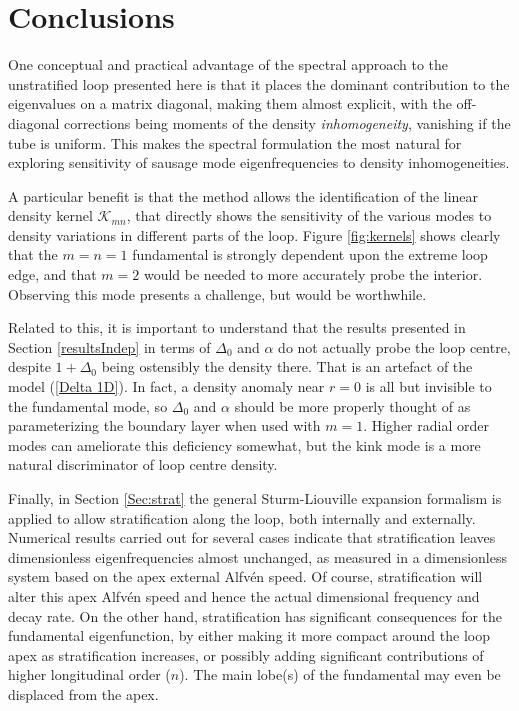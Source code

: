 \documentclass[12pt]{iopart}
\begin{document}
\section{Conclusions}

One conceptual and practical advantage of the spectral approach {to the unstratified loop} presented here is that it places the dominant contribution to the eigenvalues on a matrix diagonal, making them almost explicit, with the off-diagonal corrections being moments of the density \emph{inhomogeneity}, vanishing if the tube is uniform. This makes the spectral formulation the most natural for exploring sensitivity of sausage mode eigenfrequencies to density inhomogeneities.

A particular benefit is that the method allows the identification of the linear density kernel $\mathcal{K}_{mn}$, that directly shows the sensitivity of the various modes to density variations in different parts of the loop. Figure \ref{fig:kernels} shows clearly that the $m=n=1$ fundamental is strongly dependent upon the extreme loop edge, and that $m=2$ would be needed to more accurately probe the interior. Observing this mode presents a challenge, but would be worthwhile.

Related to this, it is important to understand that the results presented in Section \ref{resultsIndep} in terms of $\Delta_0$ and $\alpha$ do not actually probe the loop centre, despite $1+\Delta_0$ being ostensibly the density there. That is an artefact of the model (\ref{Delta 1D}). In fact, a density anomaly near $r=0$ is all but invisible to the fundamental mode, so $\Delta_0$ and $\alpha$ should be more properly thought of as parameterizing the boundary layer when used with $m=1$. Higher radial order modes can ameliorate this deficiency somewhat, but the kink mode is a more natural discriminator of loop centre density. 

{Finally, in Section \ref{Sec:strat} the general Sturm-Liouville expansion formalism is applied to allow stratification along the loop, both internally and externally. Numerical results carried out for several cases indicate that stratification leaves dimensionless eigenfrequencies almost unchanged, as measured in a dimensionless system based on the apex external Alfv\'en speed. Of course, stratification will alter this apex Alfv\'en speed and hence the actual dimensional frequency and decay rate. On the other hand, stratification has significant consequences for the fundamental eigenfunction, by either making it more compact around the loop apex as stratification increases, or possibly adding significant contributions of higher longitudinal order ($n$). The main lobe(s) of the fundamental may even be displaced from the apex.}
\end{document}
